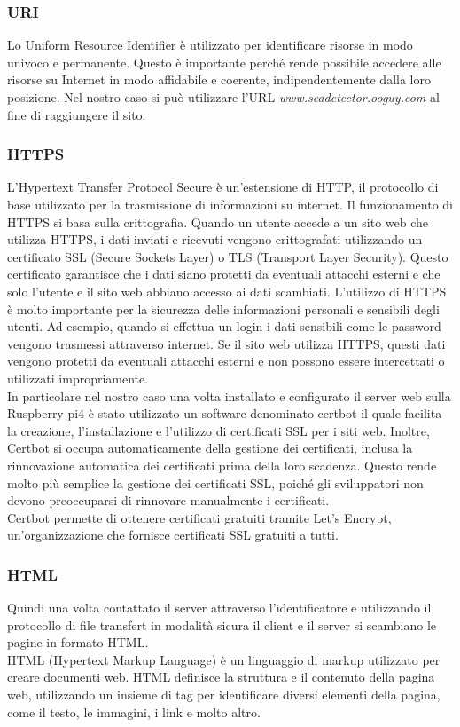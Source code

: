 \documentclass[a4paper,final,12pt]{report}
\begin{document}
\subsubsection{URI}
Lo Uniform Resource Identifier è utilizzato per identificare risorse in modo univoco e permanente. Questo è importante perché rende possibile accedere alle risorse su Internet in modo affidabile e coerente, indipendentemente dalla loro posizione. Nel nostro caso si può utilizzare l'URL \textit{www.seadetector.ooguy.com} al fine di raggiungere il sito.

\subsubsection{HTTPS}
L'Hypertext Transfer Protocol Secure è un'estensione di HTTP, il protocollo di base utilizzato per la trasmissione di informazioni su internet. Il funzionamento di HTTPS si basa sulla crittografia. Quando un utente accede a un sito web che utilizza HTTPS, i dati inviati e ricevuti vengono crittografati utilizzando un certificato SSL (Secure Sockets Layer) o TLS (Transport Layer Security). Questo certificato garantisce che i dati siano protetti da eventuali attacchi esterni e che solo l'utente e il sito web abbiano accesso ai dati scambiati.
L'utilizzo di HTTPS è molto importante per la sicurezza delle informazioni personali e sensibili degli utenti. Ad esempio, quando si effettua un login i dati sensibili come le password vengono trasmessi attraverso internet. Se il sito web utilizza HTTPS, questi dati vengono protetti da eventuali attacchi esterni e non possono essere intercettati o utilizzati impropriamente.\\
In particolare nel nostro caso una volta installato e configurato il server web sulla Ruspberry pi4 è stato utilizzato un software denominato certbot il quale facilita la creazione, l'installazione e l'utilizzo di certificati SSL per i siti web. Inoltre, Certbot si occupa automaticamente della gestione dei certificati, inclusa la rinnovazione automatica dei certificati prima della loro scadenza. Questo rende molto più semplice la gestione dei certificati SSL, poiché gli sviluppatori non devono preoccuparsi di rinnovare manualmente i certificati.\\
Certbot permette di ottenere certificati gratuiti tramite Let's Encrypt, un'organizzazione che fornisce certificati SSL gratuiti a tutti.\\

\subsubsection{HTML}
Quindi una volta contattato il server attraverso l'identificatore e utilizzando il protocollo di file transfert in modalità sicura il client e il server si scambiano le pagine in formato HTML.\\
HTML (Hypertext Markup Language) è un linguaggio di markup utilizzato per creare documenti web. HTML definisce la struttura e il contenuto della pagina web, utilizzando un insieme di tag per identificare diversi elementi della pagina, come il testo, le immagini, i link e molto altro.
\end{document}
